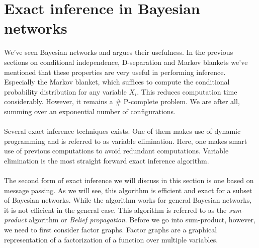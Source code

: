 \section{Exact inference in Bayesian networks}
We've seen Bayesian networks and argues their usefulness.
In the previous sections on conditional independence, D-separation
and Markov blankets we've mentioned that these properties are very
useful in performing inference. Especially the Markov blanket, which
suffices to compute the conditional probability distribution for 
any variable $X_i$. This reduces computation time considerably.
However, it remains a \# P-complete problem. We are after all,
summing over an exponential number of configurations.
\\\\
Several exact inference techniques exists. One of them makes 
use of dynamic programming and is referred to as variable 
elimination. Here, one makes smart use of previous computations
to avoid redundant computations. Variable elimination is the most
straight forward exact inference algorithm.
\\\\
The second form of exact inference we will discuss in this section
is one based on message passing. As we will see, this algorithm
is efficient and exact for a subset of Bayesian networks.
While the algorithm works for general Bayesian networks, it
is not efficient in the general case. 
This algorithm is referred to as the 
\textit{sum-product} algorithm or \textit{Belief propagation}.
Before we go into sum-product, however, we need to 
first consider factor graphs. Factor graphs are a graphical  
representation of a factorization of a function over multiple 
variables.

